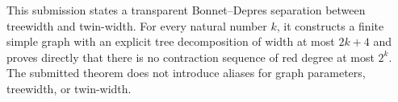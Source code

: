 This submission states a transparent Bonnet--Depres separation between treewidth and twin-width. For every natural number $k$, it constructs a finite simple graph with an explicit tree decomposition of width at most $2k+4$ and proves directly that there is no contraction sequence of red degree at most $2^k$. The submitted theorem does not introduce aliases for graph parameters, treewidth, or twin-width.
